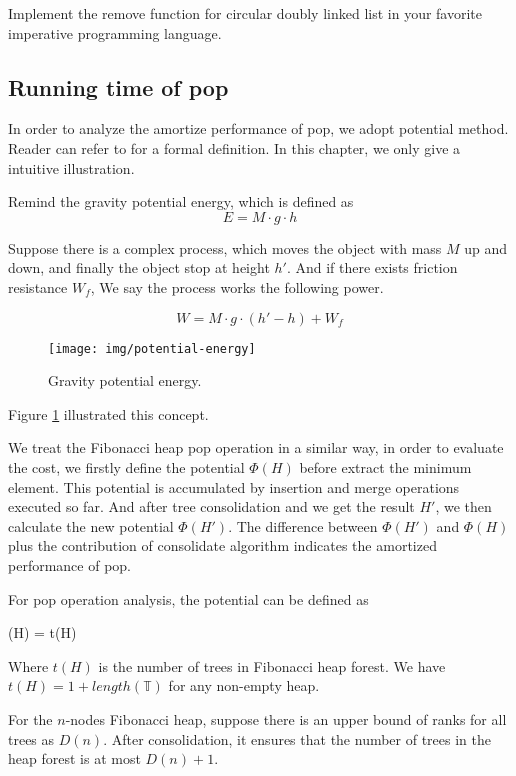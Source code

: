 \documentclass{article}
\begin{document}
\begin{Exercise}
Implement the remove function for circular doubly linked list in your favorite
imperative programming language.
\end{Exercise}

\subsection{Running time of pop}

In order to analyze the amortize performance of pop,
we adopt potential method. Reader can refer to \cite{CLRS} for a formal
definition. In this chapter, we only give a intuitive illustration.

Remind the gravity potential energy, which is defined as
\[
E = M \cdot g \cdot h
\]

Suppose there is a complex process, which moves the object with mass $M$
up and down, and finally the object stop at height $h'$. And if there
exists friction resistance $W_f$, We say
the process works the following power.

\[
W = M \cdot g \cdot (h' - h) + W_f
\]

\begin{figure}[htbp]
  \centering
  \texttt{[image: img/potential-energy]}
  \caption{Gravity potential energy.}
  \label{fig:potential-energy}
\end{figure}

Figure \ref{fig:potential-energy} illustrated this concept.

We treat the Fibonacci heap pop operation in a similar
way, in order to evaluate the cost, we firstly define the potential
$\Phi(H)$ before extract the minimum element. This potential is
accumulated by insertion and merge operations executed so far.
And after tree consolidation and
we get the result $H'$, we then calculate the new potential $\Phi(H')$.
The difference between $\Phi(H')$ and $\Phi(H)$ plus the contribution
of consolidate algorithm indicates the amortized
performance of pop.

For pop operation analysis, the potential can be defined as

\be
\Phi(H) = t(H)
\ee

Where $t(H)$ is the number of trees in Fibonacci heap forest.
We have $t(H) = 1 + length(\mathbb{T})$ for any non-empty heap.

For the $n$-nodes Fibonacci heap, suppose there is an upper bound
of ranks for all trees as $D(n)$. After consolidation, it ensures
that the number of trees in the heap forest is at most $D(n)+1$.
\end{document}
